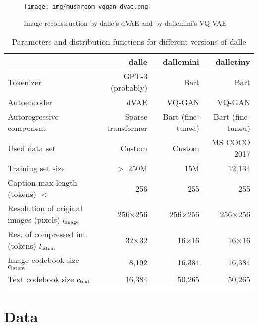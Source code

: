 \documentclass{article}
\begin{document}
\begin{figure}
    \centering
    \texttt{[image: img/mushroom-vqgan-dvae.png]}
    \caption{Image reconstruction by \gls{dalle}'s dVAE and by \gls{dallemini}'s VQ-VAE}
    \label{fig:mushroom}
\end{figure}


\begin{table*}[h!]
    \centering
    \begin{tabular}{|l|r|r|r|}
    \hline
        ~ & \gls{dalle} & \gls{dallemini} & \gls{dalletiny} \\ \hline
        Tokenizer & GPT-3 (probably) & Bart & Bart \\ \hline
        Autoencoder & dVAE & VQ-GAN & VQ-GAN \\ \hline
        Autoregressive component & Sparse transformer & Bart (fine-tuned) & Bart (fine-tuned) \\ \hline \hline
        Used data set & Custom & Custom & MS COCO 2017 \\ \hline
        Training set size & $>$ 250M & 15M & 12,134 \\ \hline \hline
        Caption max length (tokens) $\lt$ & 256 & 255  & 255 \\ \hline
        Resolution of original images (pixels) $l_{\mathrm{image}}$ & 256×256 & 256×256  & 256×256 \\ \hline
        Res. of compressed im. (tokens) ${l_{\mathrm{latent}}}$ & 32×32 & 16×16 & 16×16 \\ \hline
        Image codebook size ${c_{\mathrm{latent}}}$ & 8,192 & 16,384  & 16,384 \\ \hline
        Text codebook size ${c_{\mathrm{text}}}$ & 16,384 & 50,265 & 50,265 \\ \hline
    \end{tabular}
    \caption{Parameters and distribution functions for different versions of \gls{dalle}}
    \label{tab:parameters}
\end{table*}

\section{Data}
\end{document}
